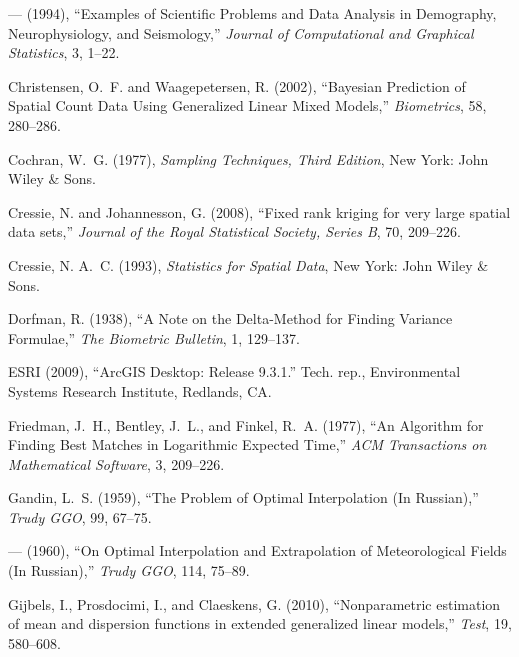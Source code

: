 \documentclass[12pt, titlepage]{article}\usepackage[]{graphicx}\usepackage[]{color}
\begin{document}
\begin{thebibliography}{47}
--- (1994), \enquote{Examples of Scientific Problems and Data Analysis in
  Demography, Neurophysiology, and Seismology,} \textit{Journal of
  Computational and Graphical Statistics}, 3, 1--22.

Christensen, O.~F. and Waagepetersen, R. (2002), \enquote{Bayesian Prediction
  of Spatial Count Data Using Generalized Linear Mixed Models,}
  \textit{Biometrics}, 58, 280--286.

Cochran, W.~G. (1977), \textit{Sampling Techniques, Third Edition}, New York:
  John Wiley \& Sons.

Cressie, N. and Johannesson, G. (2008), \enquote{Fixed rank kriging for very
  large spatial data sets,} \textit{Journal of the Royal Statistical Society,
  Series B}, 70, 209--226.

Cressie, N. A.~C. (1993), \textit{Statistics for Spatial Data}, New York: John
  Wiley \& Sons.

Dorfman, R. (1938), \enquote{A Note on the Delta-Method for Finding Variance
  Formulae,} \textit{The Biometric Bulletin}, 1, 129--137.

ESRI (2009), \enquote{ArcGIS Desktop: Release 9.3.1.} Tech. rep., Environmental
  Systems Research Institute, Redlands, CA.

Friedman, J.~H., Bentley, J.~L., and Finkel, R.~A. (1977), \enquote{An
  Algorithm for Finding Best Matches in Logarithmic Expected Time,} \textit{ACM
  Transactions on Mathematical Software}, 3, 209--226.

Gandin, L.~S. (1959), \enquote{The Problem of Optimal Interpolation (In
  Russian),} \textit{Trudy GGO}, 99, 67--75.

--- (1960), \enquote{On Optimal Interpolation and Extrapolation of
  Meteorological Fields (In Russian),} \textit{Trudy GGO}, 114, 75--89.

Gijbels, I., Prosdocimi, I., and Claeskens, G. (2010), \enquote{Nonparametric
  estimation of mean and dispersion functions in extended generalized linear
  models,} \textit{Test}, 19, 580--608.


\end{thebibliography}
\end{document}
